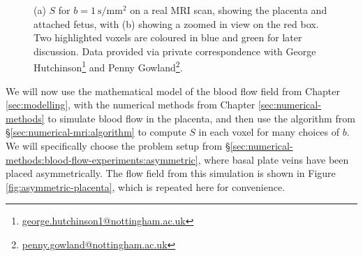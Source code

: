 \begin{figure}
\begin{centering}
\begin{subfigure}{0.5\textwidth}
\begin{centering}
                        \caption{}
                        \label{fig:mri-real:S-zoom}
                    \end{centering}
                \end{subfigure}
            \end{centering}
            \caption{(a) $S$ for $b=\qty{1}{\second\per\milli\metre^2}$ on a real MRI scan, showing the placenta and attached fetus, with (b) showing a zoomed in view on the red box. Two highlighted voxels are coloured in blue and green for later discussion. Data provided via private correspondence with George Hutchinson\protect\footnote{\href{mailto:george.hutchinson1@nottingham.ac.uk}{george.hutchinson1@nottingham.ac.uk}} and Penny Gowland\protect\footnote{\href{mailto:penny.gowland@nottingham.ac.uk}{penny.gowland@nottingham.ac.uk}}.}
            \label{fig:mri-real}
        \end{figure}

        We will now use the mathematical model of the blood flow field from Chapter \ref{sec:modelling}, with the numerical methods from Chapter \ref{sec:numerical-methods} to simulate blood flow in the placenta, and then use the algorithm from \S\ref{sec:numerical-mri:algorithm} to compute $S$ in each voxel for many choices of $b$. We will specifically choose the problem setup from \S\ref{sec:numerical-methods:blood-flow-experiments:asymmetric}, where basal plate veins have been placed asymmetrically. The flow field from this simulation is shown in Figure \ref{fig:asymmetric-placenta}, which is repeated here for convenience.

